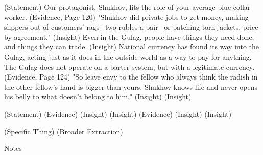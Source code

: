 \documentclass[12pt]{article}
\begin{document}
\begin{flushleft}
(Statement) Our protagonist, Shukhov, fits the role of your average blue collar worker.
(Evidence, Page 120) "Shukhov did private jobs to get money, making slippers out of customers' rags-- two rubles a pair-- or patching torn jackets, price by agreement."
(Insight) Even in the Gulag, people have things they need done, and things they can trade. 
(Insight) National currency has found its way into the Gulag, acting just as it does in the outside world as a way to pay for anything. The Gulag does not operate on a barter system, but with a legitimate currency.
(Evidence, Page 124) "So leave envy to the fellow who always think the radish in the other fellow's hand is bigger than yours. Shukhov knows life and never opens his belly to what doesn't belong to him."
(Insight) 
(Insight)

(Statement)
(Evidence)
(Insight)
(Insight)
(Evidence)
(Insight)
(Insight)

(Specific Thing)
(Broader Extraction)
\begin{center}
Notes
\end{center}


\setlength{\parindent}{0.5in}

\end{flushleft}
\end{document}
